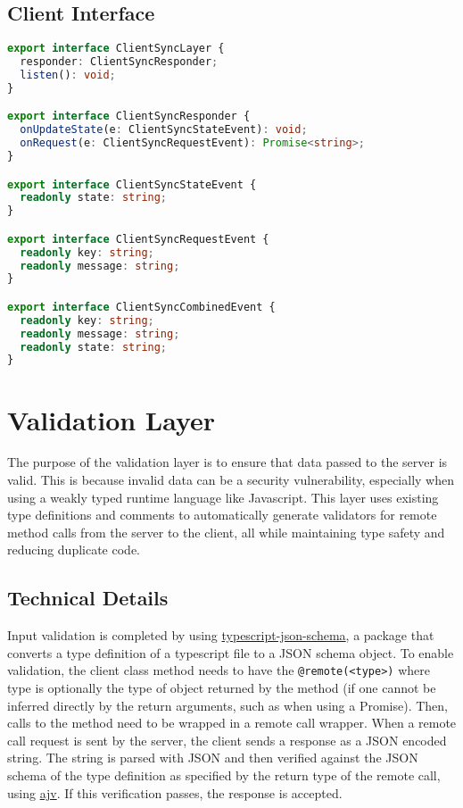 \documentclass{article}
\begin{document}
\subsection*{Client Interface}
\begin{lstlisting}[language=Typescript]
export interface ClientSyncLayer {
  responder: ClientSyncResponder;
  listen(): void;
}

export interface ClientSyncResponder {
  onUpdateState(e: ClientSyncStateEvent): void;
  onRequest(e: ClientSyncRequestEvent): Promise<string>;
}

export interface ClientSyncStateEvent {
  readonly state: string;
}

export interface ClientSyncRequestEvent {
  readonly key: string;
  readonly message: string;
}

export interface ClientSyncCombinedEvent {
  readonly key: string;
  readonly message: string;
  readonly state: string;
}
\end{lstlisting}

\section{Validation Layer}

The purpose of the validation layer is to ensure that data passed to the server is valid. This is because invalid data can be a security vulnerability, especially when using a weakly typed runtime language like Javascript. This layer uses existing type definitions and comments to automatically generate validators for remote method calls from the server to the client, all while maintaining type safety and reducing duplicate code.

\subsection*{Technical Details}

Input validation is completed by using \href{https://github.com/YousefED/typescript-json-schema/}{typescript-json-schema}, a package that converts a type definition of a typescript file to a JSON schema object. To enable validation, the client class method needs to have the \texttt{@remote(<type>)} where type is optionally the type of object returned by the method (if one cannot be inferred directly by the return arguments, such as when using a Promise). Then, calls to the method need to be wrapped in a remote call wrapper. When a remote call request is sent by the server, the client sends a response as a JSON encoded string. The string is parsed with JSON and then verified against the JSON schema of the type definition as specified by the return type of the remote call, using \href{https://github.com/epoberezkin/ajv}{ajv}. If this verification passes, the response is accepted.
\end{document}
